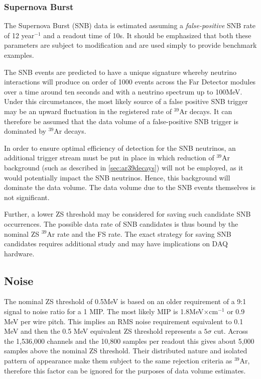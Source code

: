 \subsubsection{Supernova Burst}

The Supernova Burst (SNB) data is estimated assuming a
\textit{false-positive} SNB rate of 12 year$^{-1}$ and a readout time of
10s. It should be emphasized that both these parameters are subject to
modification and are used simply to provide benchmark examples.

The SNB events are predicted to have a unique signature whereby
neutrino interactions will produce on order of 1000 events across
the Far Detector modules over a time around ten seconds and with a
neutrino spectrum up to 100MeV. Under this circumstances, 
the most likely source of a false positive SNB trigger may be an upward
fluctuation in the registered rate of $^{39}$Ar decays.
It can therefore be assumed that the data volume of a
false-positive SNB trigger is dominated by $^{39}$Ar decays.

In order to ensure optimal efficiency of detection for the SNB neutrinos,
an  additional trigger stream must be put in place in which
reduction of $^{39}$Ar background (such as described in \ref{sec:ar39decays}) will not be employed, as it would potentially impact the SNB neutrinos. Hence, this background 
will dominate the data volume. The data volume due to the SNB events themselves is not significant.

Further, a lower ZS threshold may be considered for saving such
candidate SNB occurrences. The possible data rate of SNB candidates is thus bound by the nominal
ZS $^{39}$Ar rate and the FS rate. The exact strategy for saving SNB candidates requires additional study
and may have implications on DAQ hardware.

\subsection{Noise}

The nominal ZS threshold of 0.5MeV is based on an older requirement of a
9:1 signal to noise ratio for a 1 MIP. The most likely MIP is 1.8MeV$\times$cm$^{-1}$ or 0.9 MeV per wire pitch.
This implies an RMS noise requirement equivalent to 0.1 MeV and then the 0.5 MeV equivalent ZS
threshold represents a $5\sigma$ cut. Across the 1,536,000 channels and the 10,800 samples
per readout this gives about 5,000 samples above the nominal ZS threshold. Their distributed
nature and isolated pattern of appearance make them subject to the same rejection criteria as
$^{39}$Ar, therefore this factor can be ignored for the purposes of data volume estimates.


